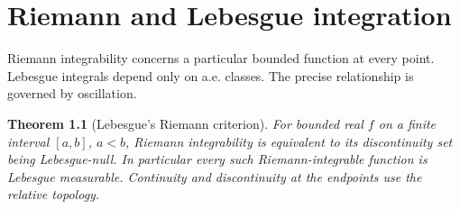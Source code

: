 \documentclass[11pt,oneside,openany]{book}
\newtheorem{theorem}{Theorem}[chapter]
\theoremstyle{definition}
\theoremstyle{remark}
\newcommand{\family}[1]{}
\begin{document}


\chapter{Riemann and Lebesgue integration}\label{ch:d11-16}

Riemann integrability concerns a particular bounded function at every
point. Lebesgue integrals depend only on a.e. classes. The precise
relationship is governed by oscillation.

\begin{theorem}[Lebesgue's Riemann criterion]\family{D11.16.riemann_criterion}\label{d11:16:riemann-criterion}
For bounded real $f$ on a finite interval $[a,b]$, $a<b$, Riemann
integrability is equivalent to its discontinuity set being Lebesgue-null.
In particular every such Riemann-integrable function is Lebesgue measurable.
Continuity and discontinuity at the endpoints use the relative topology.
\end{theorem}
\end{document}
